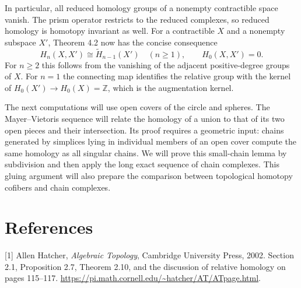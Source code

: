 \documentclass[11pt]{article}
\begin{document}
In particular, all reduced homology groups of a nonempty contractible space vanish. The prism operator restricts to the reduced complexes, so reduced homology is homotopy invariant as well. For a contractible $X$ and a nonempty subspace $X'$, Theorem 4.2 now has the concise consequence
\[H_n(X,X')\cong\widetilde H_{n-1}(X')\quad(n\ge1),\qquad H_0(X,X')=0.\]
For $n\ge2$ this follows from the vanishing of the adjacent positive-degree groups of $X$. For $n=1$ the connecting map identifies the relative group with the kernel of $H_0(X')\to H_0(X)=\mathbb Z$, which is the augmentation kernel.

The next computations will use open covers of the circle and spheres. The Mayer--Vietoris sequence will relate the homology of a union to that of its two open pieces and their intersection. Its proof requires a geometric input: chains generated by simplices lying in individual members of an open cover compute the same homology as all singular chains. We will prove this small-chain lemma by subdivision and then apply the long exact sequence of chain complexes. This gluing argument will also prepare the comparison between topological homotopy cofibers and chain complexes.

\section*{References}
[1] Allen Hatcher, \textit{Algebraic Topology}, Cambridge University Press, 2002. Section 2.1, Proposition 2.7, Theorem 2.10, and the discussion of relative homology on pages 115--117. \url{https://pi.math.cornell.edu/~hatcher/AT/ATpage.html}.
\end{document}
